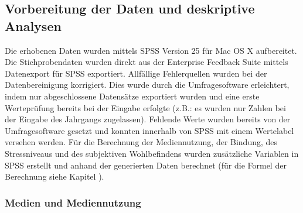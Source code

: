 \subsection{Vorbereitung der Daten und deskriptive Analysen}
Die erhobenen Daten wurden mittels SPSS Version 25 für Mac OS X aufbereitet. Die Stichprobendaten wurden direkt aus der Enterprise Feedback Suite \cite{Questback2018} mittels Datenexport für SPSS exportiert. Allfällige Fehlerquellen wurden bei der Datenbereinigung korrigiert. Dies wurde durch die Umfragesoftware erleichtert, indem nur abgeschlossene Datensätze exportiert wurden und eine erste Werteprüfung bereits bei der Eingabe erfolgte (z.B.: es wurden nur Zahlen bei der Eingabe des Jahrgangs zugelassen). Fehlende Werte wurden bereits von der Umfragesoftware gesetzt und konnten innerhalb von SPSS mit einem Wertelabel versehen werden. Für die Berechnung der Mediennutzung, der Bindung, des Stressniveaus und des subjektiven Wohlbefindens wurden zusätzliche Variablen in SPSS erstellt und anhand der generierten Daten berechnet (für die Formel der Berechnung siehe Kapitel ).

\subsubsection{Medien und Mediennutzung}

\begin{figure}
\centering
{}
\end{figure}

